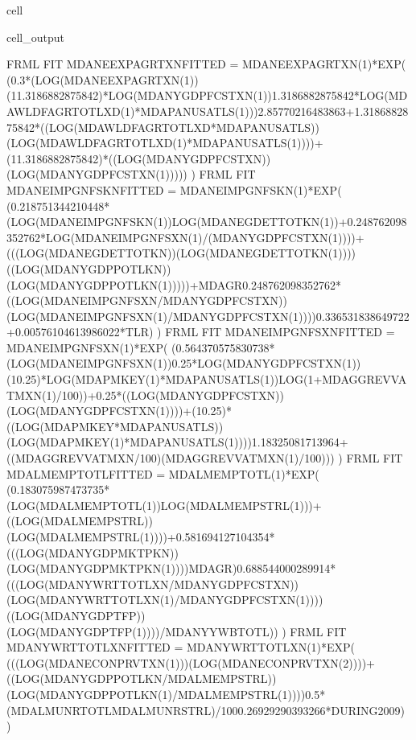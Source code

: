 \documentclass[letterpaper,10pt,english]{jupyterBook}
\begin{document}
\begin{sphinxuseclass}{cell}
\begin{sphinxVerbatimOutput}
\begin{sphinxuseclass}{cell_output}
\begin{sphinxVerbatim}[commandchars=\\\{\}]
FRML \PYGZlt{}FIT\PYGZgt{} MDANEEXPAGRTXN\PYGZus{}FITTED = MDANEEXPAGRTXN(\PYGZhy{}1)*EXP( (\PYGZhy{}0.3*(LOG(MDANEEXPAGRTXN(\PYGZhy{}1))\PYGZhy{}(1\PYGZhy{}1.3186882875842)*LOG(MDANYGDPFCSTXN(\PYGZhy{}1))\PYGZhy{}1.3186882875842*LOG(MDAWLDFAGRTOTLXD(\PYGZhy{}1)*MDAPANUSATLS(\PYGZhy{}1)))\PYGZhy{}2.85770216483863+1.3186882875842*((LOG(MDAWLDFAGRTOTLXD*MDAPANUSATLS))\PYGZhy{}(LOG(MDAWLDFAGRTOTLXD(\PYGZhy{}1)*MDAPANUSATLS(\PYGZhy{}1))))+(1\PYGZhy{}1.3186882875842)*((LOG(MDANYGDPFCSTXN))\PYGZhy{}(LOG(MDANYGDPFCSTXN(\PYGZhy{}1))))) ) \PYGZdl{}
FRML \PYGZlt{}FIT\PYGZgt{} MDANEIMPGNFSKN\PYGZus{}FITTED = MDANEIMPGNFSKN(\PYGZhy{}1)*EXP( (\PYGZhy{}0.218751344210448*(LOG(MDANEIMPGNFSKN(\PYGZhy{}1))\PYGZhy{}LOG(MDANEGDETTOTKN(\PYGZhy{}1))+0.248762098352762*LOG(MDANEIMPGNFSXN(\PYGZhy{}1)/(MDANYGDPFCSTXN(\PYGZhy{}1))))+(((LOG(MDANEGDETTOTKN))\PYGZhy{}(LOG(MDANEGDETTOTKN(\PYGZhy{}1))))\PYGZhy{}((LOG(MDANYGDPPOTLKN))\PYGZhy{}(LOG(MDANYGDPPOTLKN(\PYGZhy{}1)))))+MDAGR\PYGZhy{}0.248762098352762*((LOG(MDANEIMPGNFSXN/MDANYGDPFCSTXN))\PYGZhy{}(LOG(MDANEIMPGNFSXN(\PYGZhy{}1)/MDANYGDPFCSTXN(\PYGZhy{}1))))\PYGZhy{}0.336531838649722+0.00576104613986022*T\PYGZus{}LR) ) \PYGZdl{}
FRML \PYGZlt{}FIT\PYGZgt{} MDANEIMPGNFSXN\PYGZus{}FITTED = MDANEIMPGNFSXN(\PYGZhy{}1)*EXP( (\PYGZhy{}0.564370575830738*(LOG(MDANEIMPGNFSXN(\PYGZhy{}1))\PYGZhy{}0.25*LOG(MDANYGDPFCSTXN(\PYGZhy{}1))\PYGZhy{}(1\PYGZhy{}0.25)*LOG(MDAPMKEY(\PYGZhy{}1)*MDAPANUSATLS(\PYGZhy{}1))\PYGZhy{}LOG(1+MDAGGREVVATMXN(\PYGZhy{}1)/100))+0.25*((LOG(MDANYGDPFCSTXN))\PYGZhy{}(LOG(MDANYGDPFCSTXN(\PYGZhy{}1))))+(1\PYGZhy{}0.25)*((LOG(MDAPMKEY*MDAPANUSATLS))\PYGZhy{}(LOG(MDAPMKEY(\PYGZhy{}1)*MDAPANUSATLS(\PYGZhy{}1))))\PYGZhy{}1.18325081713964+((MDAGGREVVATMXN/100)\PYGZhy{}(MDAGGREVVATMXN(\PYGZhy{}1)/100))) ) \PYGZdl{}
FRML \PYGZlt{}FIT\PYGZgt{} MDALMEMPTOTL\PYGZus{}FITTED = MDALMEMPTOTL(\PYGZhy{}1)*EXP( (\PYGZhy{}0.183075987473735*(LOG(MDALMEMPTOTL(\PYGZhy{}1))\PYGZhy{}LOG(MDALMEMPSTRL(\PYGZhy{}1)))+((LOG(MDALMEMPSTRL))\PYGZhy{}(LOG(MDALMEMPSTRL(\PYGZhy{}1))))+0.581694127104354*(((LOG(MDANYGDPMKTPKN))\PYGZhy{}(LOG(MDANYGDPMKTPKN(\PYGZhy{}1))))\PYGZhy{}MDAGR)\PYGZhy{}0.688544000289914*(((LOG(MDANYWRTTOTLXN/MDANYGDPFCSTXN))\PYGZhy{}(LOG(MDANYWRTTOTLXN(\PYGZhy{}1)/MDANYGDPFCSTXN(\PYGZhy{}1))))\PYGZhy{}((LOG(MDANYGDPTFP))\PYGZhy{}(LOG(MDANYGDPTFP(\PYGZhy{}1))))/MDANYYWBTOTL\PYGZus{})) ) \PYGZdl{}
FRML \PYGZlt{}FIT\PYGZgt{} MDANYWRTTOTLXN\PYGZus{}FITTED = MDANYWRTTOTLXN(\PYGZhy{}1)*EXP( (((LOG(MDANECONPRVTXN(\PYGZhy{}1)))\PYGZhy{}(LOG(MDANECONPRVTXN(\PYGZhy{}2))))+((LOG(MDANYGDPPOTLKN/MDALMEMPSTRL))\PYGZhy{}(LOG(MDANYGDPPOTLKN(\PYGZhy{}1)/MDALMEMPSTRL(\PYGZhy{}1))))\PYGZhy{}0.5*(MDALMUNRTOTL\PYGZus{}\PYGZhy{}MDALMUNRSTRL\PYGZus{})/100\PYGZhy{}0.26929290393266*DURING\PYGZus{}2009) ) \PYGZdl{}

\end{sphinxVerbatim}
\end{sphinxuseclass}
\end{sphinxVerbatimOutput}
\end{sphinxuseclass}
\end{document}
